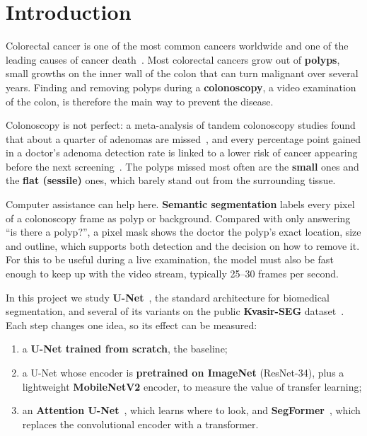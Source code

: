 \section{Introduction}
\label{sec:intro}

Colorectal cancer is one of the most common cancers worldwide and one of the leading causes of cancer
death~\cite{sung2021globocan}. Most colorectal cancers grow out of \textbf{polyps}, small growths on the inner
wall of the colon that can turn malignant over several years. Finding and removing polyps during a
\textbf{colonoscopy}, a video examination of the colon, is therefore the main way to prevent the disease.

Colonoscopy is not perfect: a meta-analysis of tandem colonoscopy studies found that about a quarter of
adenomas are missed~\cite{zhao2019miss}, and every percentage point gained in a doctor's adenoma detection
rate is linked to a lower risk of cancer appearing before the next screening~\cite{corley2014adr}. The
polyps missed most often are the \textbf{small} ones and the \textbf{flat (sessile)} ones, which barely stand out
from the surrounding tissue.

Computer assistance can help here. \textbf{Semantic segmentation} labels every pixel of a colonoscopy frame as
polyp or background. Compared with only answering ``is there a polyp?'', a pixel mask shows the doctor the
polyp's exact location, size and outline, which supports both detection and the decision on how to remove it.
For this to be useful during a live examination, the model must also be fast enough to keep up with the
video stream, typically 25--30 frames per second.

In this project we study \textbf{U-Net}~\cite{ronneberger2015unet}, the standard architecture for biomedical
segmentation, and several of its variants on the public \textbf{Kvasir-SEG} dataset~\cite{jha2020kvasir}. Each
step changes one idea, so its effect can be measured:
\begin{enumerate}
  \item a \textbf{U-Net trained from scratch}, the baseline;
  \item a U-Net whose encoder is \textbf{pretrained on ImageNet} (ResNet-34), plus a lightweight \textbf{MobileNetV2}
        encoder, to measure the value of transfer learning;
  \item an \textbf{Attention U-Net}~\cite{oktay2018attention}, which learns where to look, and
        \textbf{SegFormer}~\cite{xie2021segformer}, which replaces the convolutional encoder with a transformer.
\end{enumerate}

